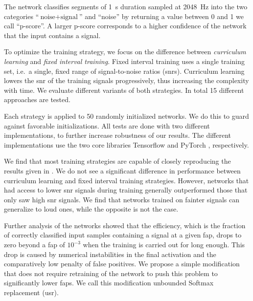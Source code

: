 The network classifies segments of \SI{1}{\second} duration sampled at \SI{2048}{\hertz} into the two categories ``$\text{noise}+\text{signal}$'' and ``noise'' by returning a value between 0 and 1 we call ``p-score''. A larger p-score corresponds to a higher confidence of the network that the input contains a signal.

To optimize the training strategy, we focus on the difference between \textit{curriculum learning} \cite{Bengio:2009aaa} and \textit{fixed interval training}. Fixed interval training uses a single training set, i.e.\ a single, fixed range of signal-to-noise ratios (\acrshort{snr}s). Curriculum learning lowers the \acrshort{snr} of the training signals progressively, thus increasing the complexity with time. We evaluate different variants of both strategies. In total 15 different approaches are tested.

Each strategy is applied to 50 randomly initialized networks. We do this to guard against favorable initializations. All tests are done with two different implementations, to further increase robustness of our results. The different implementations use the two core libraries Tensorflow \cite{Abadi:2015aaa} and PyTorch \cite{Paszke:2019aaa}, respectively.

We find that most training strategies are capable of closely reproducing the results given in \cite{Gabbard:2017lja}. We do not see a significant difference in performance between curriculum learning and fixed interval training strategies. However, networks that had access to lower \acrshort{snr} signals during training generally outperformed those that only saw high \acrshort{snr} signals. We find that networks trained on fainter signals can generalize to loud ones, while the opposite is not the case.

Further analysis of the networks showed that the efficiency, which is the fraction of correctly classified input samples containing a signal at a given \acrshort{fap}, drops to zero beyond a \acrshort{fap} of $10^{-3}$ when the training is carried out for long enough. This drop is caused by numerical instabilities in the final activation and the comparatively low penalty of false positives. We propose a simple modification that does not require retraining of the network to push this problem to significantly lower \acrshort{fap}s. We call this modification unbounded Softmax replacement (\acrshort{usr}).

